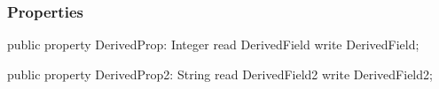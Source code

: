 \documentclass{report}
\newif\ifpdf
\begin{document}
\subsubsection*{\large{\textbf{Properties}}\normalsize\hspace{1ex}\hfill}
\begin{list}{}{
\setlength{\itemindent}{0cm}
\setlength{\listparindent}{0cm}
\setlength{\leftmargin}{\evensidemargin}
\addtolength{\leftmargin}{\tmplength}
\settowidth{\labelsep}{X}
\addtolength{\leftmargin}{\labelsep}
\setlength{\labelwidth}{\tmplength}
}
\label{ok_inherited_members.TDerived-DerivedProp}
\item[\textbf{DerivedProp}\hfill]
\ifpdf
\begin{flushleft}
\fi
\begin{ttfamily}
public property DerivedProp: Integer read DerivedField write DerivedField;\end{ttfamily}

\ifpdf
\end{flushleft}
\fi


\par  \label{ok_inherited_members.TDerived-DerivedProp2}
\item[\textbf{DerivedProp2}\hfill]
\ifpdf
\begin{flushleft}
\fi
\begin{ttfamily}
public property DerivedProp2: String read DerivedField2 write DerivedField2;\end{ttfamily}

\ifpdf
\end{flushleft}
\fi


\par  \end{list}
\end{document}
